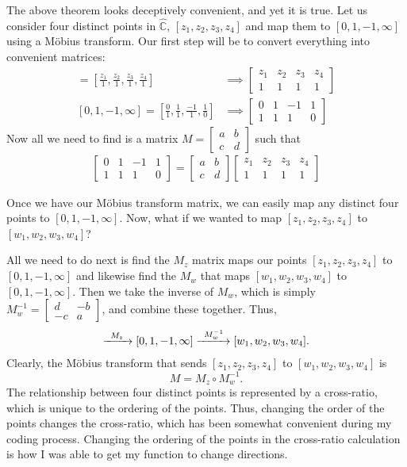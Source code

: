 \documentclass[12pt,a4paper,reqno,parskip=full]{amsart}
\numberwithin{equation}{section}
\theoremstyle{plain}
\theoremstyle{definition}
\def\C{{\mathbb C}}
\begin{document}
The above theorem looks deceptively convenient, and yet it is true. Let us consider four distinct points in $\hat\C$, $[z_1,z_2,z_3,z_4]$ and map them to $[0,1,-1,\infty]$ using a Möbius transform. Our first step will be to convert everything into convenient matrices:
\begin{align*}
[z_1,z_2,z_3,z_4]=\left[\frac{z_1}{1},\frac{z_2}{1},\frac{z_3}{1},\frac{z_4}{1}\right]
&\implies
\begin{bmatrix}z_1 & z_2 & z_3 & z_4 \\ 1 & 1 & 1 & 1\end{bmatrix}\\
[0,1,-1,\infty]=\left[\frac{0}{1},\frac{1}{1},\frac{-1}{1},\frac{1}{0}\right]
&\implies
\begin{bmatrix}0 & 1 & -1 & 1\\ 1 & 1 & 1 & 0\end{bmatrix}
\end{align*}
Now all we need to find is a matrix $M=\begin{bmatrix}a&b\\c&d\end{bmatrix}$ such that
\begin{align*}
\begin{bmatrix}0 & 1 & -1 & 1\\ 1 & 1 & 1 & 0\end{bmatrix}=
\begin{bmatrix}a&b\\c&d\end{bmatrix}
\begin{bmatrix}z_1 & z_2 & z_3 & z_4 \\ 1 & 1 & 1 & 1\end{bmatrix}
\end{align*}

Once we have our Möbius transform matrix, we can easily map any distinct four points to $[0,1,-1,\infty]$. Now, what if we wanted to map $[z_1,z_2,z_3,z_4]$ to $[w_1,w_2,w_3,w_4]$?

All we need to do next is find the $M_z$ matrix maps our points $[z_1,z_2,z_3,z_4]$ to $[0,1,-1,\infty]$ and likewise find the $M_w$ that maps $[w_1,w_2,w_3,w_4]$ to $[0,1,-1,\infty]$. Then we take the inverse of $M_w$, which is simply $M_w^{-1}=\left[\begin{smallmatrix}d&-b\\-c&a\end{smallmatrix}\right]$, and combine these together. Thus,
\begin{align*}
[z_1,z_2,z_3,z_4]\xrightarrow{\text{\;\;$M_z$\;\;}}[0,1,-1,\infty]\xrightarrow{\text{\;\;$M_w^{-1}$\;}}[w_1,w_2,w_3,w_4].
\end{align*}
 Clearly, the Möbius transform that sends $[z_1,z_2,z_3,z_4]$ to $[w_1,w_2,w_3,w_4]$ is
\[M=M_z\circ M_w^{-1}.\]
The relationship between four distinct points is represented by a cross-ratio, which is unique to the ordering of the points. Thus, changing the order of the points changes the cross-ratio, which has been somewhat convenient during my coding process. Changing the ordering of the points in the cross-ratio calculation is how I was able to get my function to change directions.
\end{document}
